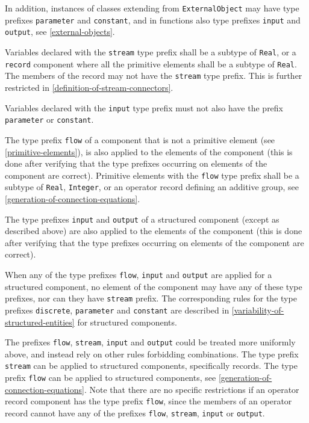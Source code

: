In addition, instances of classes extending from \lstinline!ExternalObject! may have type prefixes \lstinline!parameter! and \lstinline!constant!, and in functions also type prefixes \lstinline!input! and \lstinline!output!, see \cref{external-objects}.

Variables declared with the \lstinline!stream! type prefix shall be a subtype of \lstinline!Real!, or a \lstinline!record! component where all the primitive elements shall be a subtype of \lstinline!Real!.
The members of the record may not have the \lstinline!stream! type prefix.
This is further restricted in \cref{definition-of-stream-connectors}.

Variables declared with the \lstinline!input! type prefix must not also have the prefix \lstinline!parameter! or \lstinline!constant!.

The type prefix \lstinline!flow! of a component that is not a primitive element (see \cref{primitive-elements}), is also applied to the elements of the component (this is done after verifying that the type prefixes occurring on elements of the component are correct).
Primitive elements with the \lstinline!flow! type prefix shall be a subtype of \lstinline!Real!, \lstinline!Integer!, or an operator record defining an additive group, see \cref{generation-of-connection-equations}.

The type prefixes \lstinline!input! and \lstinline!output! of a structured component (except as described above) are also applied to the elements of the component (this is done after verifying that the type prefixes occurring on elements of the component are correct).

When any of the type prefixes \lstinline!flow!, \lstinline!input! and \lstinline!output! are applied for a structured component, no element of the component may have any of these type prefixes, nor can they have \lstinline!stream! prefix.
The corresponding rules for the type prefixes \lstinline!discrete!, \lstinline!parameter! and \lstinline!constant! are described in \cref{variability-of-structured-entities} for structured components.

\begin{nonnormative}
The prefixes \lstinline!flow!, \lstinline!stream!, \lstinline!input! and \lstinline!output! could be treated more uniformly above, and instead rely on other rules forbidding combinations.
The type prefix \lstinline!stream! can be applied to structured components, specifically records.
The type prefix \lstinline!flow! can be applied to structured components, see \cref{generation-of-connection-equations}.
Note that there are no specific restrictions if an operator record component has the type prefix \lstinline!flow!, since the members of an operator record cannot have any of the prefixes \lstinline!flow!, \lstinline!stream!, \lstinline!input! or \lstinline!output!.
\end{nonnormative}

